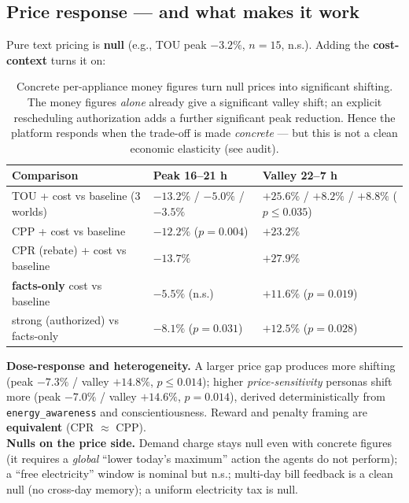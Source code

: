 \documentclass[11pt]{article}
\begin{document}
\subsection{Price response --- and what makes it work}
Pure text pricing is \textbf{null} (e.g., TOU peak $-3.2\%$, $n=15$, n.s.). Adding the \textbf{cost-context}
turns it on:
\begin{table}[h]
\centering
\small
\begin{tabular}{lll}
\hline
\textbf{Comparison} & \textbf{Peak 16--21 h} & \textbf{Valley 22--7 h} \\
\hline
TOU + cost vs baseline (3 worlds) & $-13.2\%$ / $-5.0\%$ / $-3.5\%$ & $+25.6\%$ / $+8.2\%$ / $+8.8\%$ ($p\le 0.035$) \\
CPP + cost vs baseline & $-12.2\%$ ($p=0.004$) & $+23.2\%$ \\
CPR (rebate) + cost vs baseline & $-13.7\%$ & $+27.9\%$ \\
\textbf{facts-only} cost vs baseline & $-5.5\%$ (n.s.) & $+11.6\%$ ($p=0.019$) \\
strong (authorized) vs facts-only & $-8.1\%$ ($p=0.031$) & $+12.5\%$ ($p=0.028$) \\
\hline
\end{tabular}
\caption{Concrete per-appliance money figures turn null prices into significant shifting. The money
figures \emph{alone} already give a significant valley shift; an explicit rescheduling authorization adds
a further significant peak reduction. Hence the platform responds when the trade-off is made
\emph{concrete} --- but this is not a clean economic elasticity (see audit).}
\end{table}

\noindent
\textbf{Dose-response and heterogeneity.} A larger price gap produces more shifting (peak $-7.3\%$ /
valley $+14.8\%$, $p\le 0.014$); higher \emph{price-sensitivity} personas shift more (peak $-7.0\%$ /
valley $+14.6\%$, $p=0.014$), derived deterministically from \texttt{energy\_awareness} and
conscientiousness. Reward and penalty framing are \textbf{equivalent} (CPR $\approx$ CPP).\\[2pt]
\textbf{Nulls on the price side.} Demand charge stays null even with concrete figures (it requires a
\emph{global} ``lower today's maximum'' action the agents do not perform); a ``free electricity'' window is
nominal but n.s.; multi-day bill feedback is a clean null (no cross-day memory); a uniform electricity tax
is null.
\end{document}
